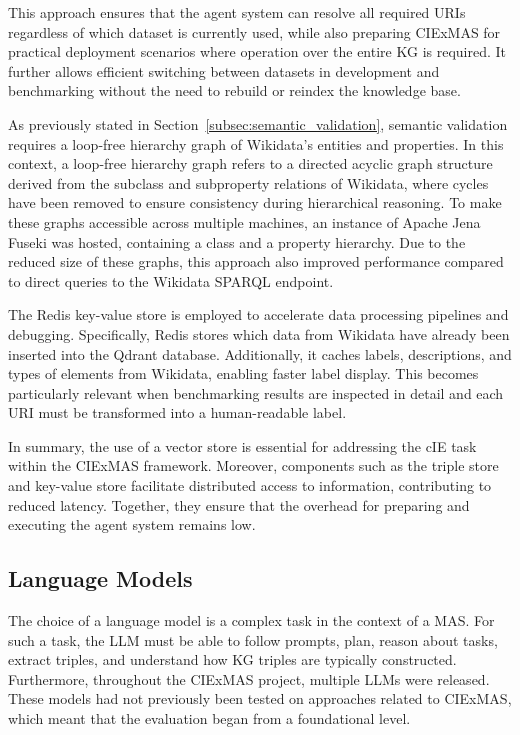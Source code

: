 \documentclass[a4paper,oneside,bibliography=totoc]{scrbook}
\begin{document}
This approach ensures that the agent system can resolve all required \acp{URI} regardless of which dataset is currently used, while also preparing CIExMAS for practical deployment scenarios where operation over the entire \ac{KG} is required. It further allows efficient switching between datasets in development and benchmarking without the need to rebuild or reindex the knowledge base.

As previously stated in Section~\ref{subsec:semantic_validation}, semantic validation requires a loop-free hierarchy graph of Wikidata's entities and properties. In this context, a loop-free hierarchy graph refers to a directed acyclic graph structure derived from the subclass and subproperty relations of Wikidata, where cycles have been removed to ensure consistency during hierarchical reasoning. To make these graphs accessible across multiple machines, an instance of Apache Jena Fuseki was hosted, containing a class and a property hierarchy. Due to the reduced size of these graphs, this approach also improved performance compared to direct queries to the Wikidata \ac{SPARQL} endpoint.

The Redis key-value store is employed to accelerate data processing pipelines and debugging. Specifically, Redis stores which data from Wikidata have already been inserted into the Qdrant database. Additionally, it caches labels, descriptions, and types of elements from Wikidata, enabling faster label display. This becomes particularly relevant when benchmarking results are inspected in detail and each \ac{URI} must be transformed into a human-readable label.

In summary, the use of a vector store is essential for addressing the \ac{cIE} task within the CIExMAS framework. Moreover, components such as the triple store and key-value store facilitate distributed access to information, contributing to reduced latency. Together, they ensure that the overhead for preparing and executing the agent system remains low.

\subsection{Language Models}
\label{subsec:eval_language_models}

The choice of a language model is a complex task in the context of a \ac{MAS}. For such a task, the \ac{LLM} must be able to follow prompts, plan, reason about tasks, extract triples, and understand how \ac{KG} triples are typically constructed. Furthermore, throughout the CIExMAS project, multiple \acp{LLM} were released. These models had not previously been tested on approaches related to CIExMAS, which meant that the evaluation began from a foundational level.
\end{document}
